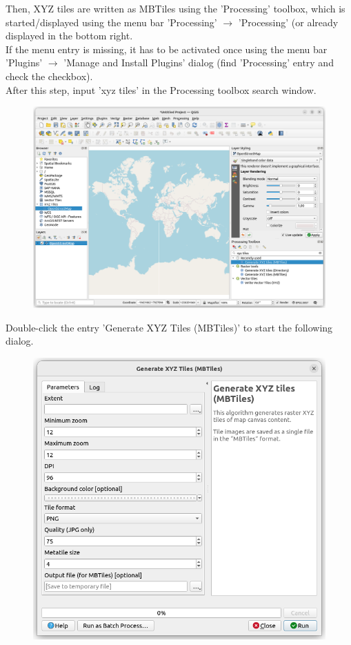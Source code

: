 Then, XYZ tiles are written as MBTiles using the 'Processing' toolbox, which is started/displayed using the menu bar 'Processing' $\rightarrow$ 'Processing' (or already displayed in the bottom right. \\

If the menu entry is missing, it has to be activated once using the menu bar 'Plugins' $\rightarrow$ 'Manage and Install Plugins' dialog (find 'Processing' entry and check the checkbox). \\

After this step, input 'xyz tiles' in the Processing toolbox search window.

\begin{figure}[H]
    \hspace*{-2cm}
    \includegraphics[width=18cm,frame]{figures/qgis_osm2.png}
\end{figure}

Double-click the entry 'Generate XYZ Tiles (MBTiles)' to start the following dialog.

\begin{figure}[H]
    \includegraphics[width=12cm,frame]{figures/qgis_osm3.png}
\end{figure}

